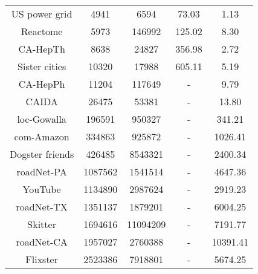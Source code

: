 \documentclass[sigconf]{acmart}
\begin{document}
\begin{table}
\begin{tabular}{ccccc}
    US power grid          & 4941                 & 6594                 & 73.03                              & 1.13            \\
    Reactome               & 5973                 & 146992               & 125.02                             & 8.30            \\
    CA-HepTh               & 8638                 & 24827                & 356.98                             & 2.72            \\
    Sister cities          & 10320                & 17988                & 605.11                             & 5.19            \\
    CA-HepPh               & 11204                & 117649               & -                                  & 9.79            \\
    CAIDA                  & 26475                & 53381                & -                                  & 13.80           \\
    loc-Gowalla            & 196591               & 950327               & -                                  & 341.21          \\
    com-Amazon             & 334863               & 925872               & -                                  & 1026.41         \\
    Dogster friends        & 426485               & 8543321              & -                                  & 2400.34         \\
    roadNet-PA             & 1087562              & 1541514              & -                                  & 4647.36         \\
    YouTube                & 1134890              & 2987624              & -                                  & 2919.23         \\
    roadNet-TX             & 1351137              & 1879201              & -                                  & 6004.25         \\
    Skitter                & 1694616              & 11094209             & -                                  & 7191.77         \\
    roadNet-CA             & 1957027              & 2760388              & -                                  & 10391.41        \\
    Flixster               & 2523386              & 7918801              & -                                  & 5674.25         \\
    \bottomrule
  \end{tabular}
\end{table}
\end{document}

